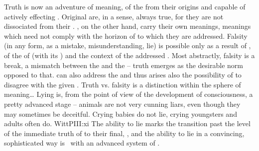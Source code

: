 Truth is now an adventure of meaning, of the 
from their origins and capable of actively effecting .
Original  are, in a sense, always true, for they are not dissociated
from their . , on the other hand, carry
their own meanings, meanings which need not comply with the horizon of
 to which they are addressed.  Falsity (in any form, as a
mistake, misunderstanding, lie) is possible only as a result of
, of the  of  (with its )
and the context of the addressed . Most abstractly, falsity is
a break, a mismatch between the 
 and the  -- truth emerges as the desirable norm opposed
to that.  can also address the  and
thus arises also the possibility of  to
disagree with the given . 
Truth 
vs. falsity is a distinction within the sphere of meaning\ldots{} Lying is, from the point of view of the development of consciousness, a
pretty advanced stage -- animals are not very cunning liars, even though they
may sometimes be deceitful.  Crying babies do not lie, crying youngsters
and adults often do. \citet{A child has much to learn before it can pretend. (A
  dog cannot be a hypocrite, but neither can he be
  sincere.)}{WittPI}{II:xi} The ability to lie marks the
transition past the level 
of the immediate truth of  to their final, , and the ability to lie in a convincing, sophisticated way is
\equi\ with an advanced system of .

